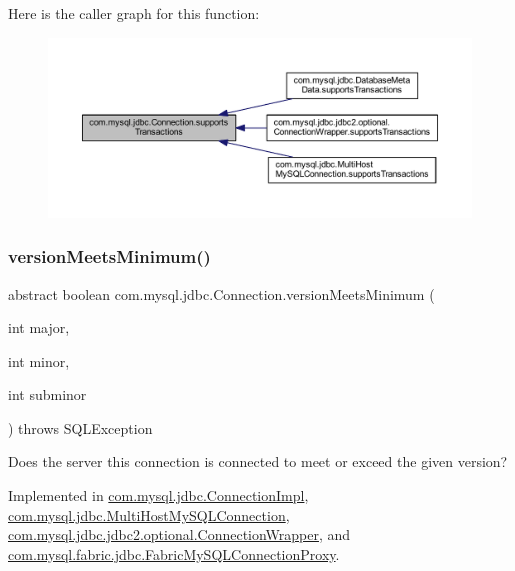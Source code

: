 Here is the caller graph for this function\+:\nopagebreak
\begin{figure}[H]
\begin{center}
\leavevmode
\includegraphics[width=350pt]{interfacecom_1_1mysql_1_1jdbc_1_1_connection_a730de8090ab7cf2acfbcb2fefbd84ea2_icgraph}
\end{center}
\end{figure}
\mbox{\label{interfacecom_1_1mysql_1_1jdbc_1_1_connection_af05f0b2545de1a6a1ca7d41f467516d3}} 
\subsubsection{\texorpdfstring{version\+Meets\+Minimum()}{versionMeetsMinimum()}}
{\footnotesize\ttfamily abstract boolean com.\+mysql.\+jdbc.\+Connection.\+version\+Meets\+Minimum (\begin{DoxyParamCaption}\item[{int}]{major,  }\item[{int}]{minor,  }\item[{int}]{subminor }\end{DoxyParamCaption}) throws S\+Q\+L\+Exception\hspace{0.3cm}{\ttfamily [abstract]}}

Does the server this connection is connected to meet or exceed the given version? 

Implemented in \mbox{\hyperlink{classcom_1_1mysql_1_1jdbc_1_1_connection_impl_ac3cf366e43f103cfc8b29b81a2a1d25e}{com.\+mysql.\+jdbc.\+Connection\+Impl}}, \mbox{\hyperlink{classcom_1_1mysql_1_1jdbc_1_1_multi_host_my_s_q_l_connection_a8e2a15f4a6eef23983bff753a54c0911}{com.\+mysql.\+jdbc.\+Multi\+Host\+My\+S\+Q\+L\+Connection}}, \mbox{\hyperlink{classcom_1_1mysql_1_1jdbc_1_1jdbc2_1_1optional_1_1_connection_wrapper_aa9d07d33f8163adfb5783228d7a86788}{com.\+mysql.\+jdbc.\+jdbc2.\+optional.\+Connection\+Wrapper}}, and \mbox{\hyperlink{classcom_1_1mysql_1_1fabric_1_1jdbc_1_1_fabric_my_s_q_l_connection_proxy_ab2140e74f8ea7de645f157f8416a8d37}{com.\+mysql.\+fabric.\+jdbc.\+Fabric\+My\+S\+Q\+L\+Connection\+Proxy}}.

